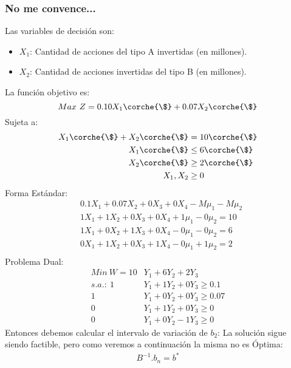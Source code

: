 \begin{homeworkProblem}
\subsubsection{No me convence...}
Las variables de decisión son:
\begin{itemize}
	\item $X_1$: Cantidad de acciones del tipo A invertidas (en millones).
	\item $X_2$: Cantidad de acciones invertidas del tipo B (en millones).
\end{itemize}
La función objetivo es: 
\begin{equation}
	Max\ Z = 0.10X_1\corche{\$} + 0.07X_2\corche{\$}
\end{equation}
Sujeta a:
\begin{align*}
	X_1\corche{\$}+X_2\corche{\$} &= 10\corche{\$} \\
	X_1\corche{\$} &\le 6\corche{\$} \\
	X_2\corche{\$} &\ge 2\corche{\$} \\
	X_1,X_2 &\ge 0
\end{align*}
Forma Estándar:
\begin{align*}
&0.1X_1 + 0.07X_2 + 0X_3 + 0X_4 - M\mu_1 - M\mu_2 \\
&1X_1 +1X_2 + 0X_3 + 0X_4 + 1\mu_1 - 0\mu_2 = 10 \\
&1X_1 + 0X_2 + 1X_3 + 0X_4 - 0\mu_1 - 0\mu_2 = 6\\
&0X_1 + 1X_2 + 0X_3 + 1X_4 - 0\mu_1 + 1\mu_2 = 2\\
\end{align*}
Problema Dual:
\begin{align*}
    Min\ W = 10&Y_1 + 6Y_2 + 2Y_3 \\
    s.a.:\ 1&Y_1 + 1Y_2 + 0Y_3 \ge 0.1 \\
    1&Y_1 + 0Y_2  + 0Y_3 \ge 0.07 \\
    0&Y_1 + 1Y_2 + 0Y_3 \ge 0 \\
    0&Y_1 + 0Y_2 - 1 Y_3 \ge 0
\end{align*}
Entonces debemos calcular el intervalo de variación de $b_2$:
La solución sigue siendo factible, pero como veremos a continuación la misma no es Óptima:
\begin{align*}
    B^{-1}.b_n = b^{*} \\

\end{align*}
\end{homeworkProblem}
